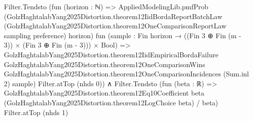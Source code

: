 \documentclass[10pt]{article}
\begin{document}
\begin{ReviewVerbatim}
                          Filter.Tendsto
                            (fun (horizon : ℕ) =>
                              AppliedModelingLib.pmfProb
                                (GolzHaghtalabYang2025Distortion.theorem12IidBordaReportBatchLaw
                                  (GolzHaghtalabYang2025Distortion.theorem12OneComparisonReportLaw sampling preference)
                                  horizon)
                                fun (sample : Fin horizon → ((Fin 3 ⊕ Fin (m - 3)) × (Fin 3 ⊕ Fin (m - 3))) × Bool) =>
                                GolzHaghtalabYang2025Distortion.theorem12IidEmpiricalBordaFailure
                                  GolzHaghtalabYang2025Distortion.theorem12OneComparisonWins
                                  GolzHaghtalabYang2025Distortion.theorem12OneComparisonIncidences (Sum.inl 2) sample)
                            Filter.atTop (nhds 0)) ∧
  Filter.Tendsto
    (fun (beta : ℝ) =>
      GolzHaghtalabYang2025Distortion.theorem12Eq10Coefficient beta
          (GolzHaghtalabYang2025Distortion.theorem12LogChoice beta) /
        beta)
    Filter.atTop (nhds 1)
\end{ReviewVerbatim}
\end{document}
